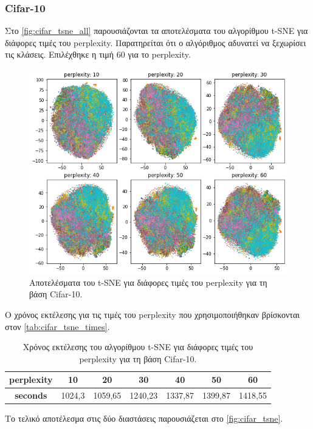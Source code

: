 \documentclass[a4paper]{article}
\begin{document}
\subsubsection{Cifar-10}

Στο \autoref{fig:cifar_tsne_all} παρουσιάζονται τα αποτελέσματα του αλγορίθμου
t-SNE για διάφορες τιμές του perplexity. Παρατηρείται ότι ο αλγόριθμος αδυνατεί
να ξεχωρίσει τις κλάσεις. Επιλέχθηκε η τιμή 60 για το perplexity.

\begin{figure}[H]
    \centering
    \includegraphics[width=0.6\linewidth]{cifar/tsne_all.png}
    \caption{Αποτελέσματα του t-SNE για διάφορες τιμές του perplexity για τη
    βάση Cifar-10.}
    \label{fig:cifar_tsne_all}
\end{figure}

Ο χρόνος εκτέλεσης για τις τιμές του perplexity που χρησιμοποιήθηκαν βρίσκονται
στον \autoref{tab:cifar_tsne_times}.

\begin{table}[H]
\centering
\begin{tabular}{|c|c|c|c|c|c|c|}
\hline
\textbf{perplexity} & \textbf{10} & \textbf{20} & \textbf{30} & \textbf{40} & \textbf{50} & \textbf{60} \\ \hline
\textbf{seconds}    & 1024,3      & 1059,65     & 1240,23     & 1337,87     & 1399,87     & 1418,55     \\ \hline
\end{tabular}
\caption{Χρόνος εκτέλεσης του αλγορίθμου t-SNE για διάφορες τιμές του perplexity
    για τη βάση Cifar-10.}
\label{tab:cifar_tsne_times}
\end{table}

Το τελικό αποτέλεσμα στις δύο διαστάσεις παρουσιάζεται στο
\autoref{fig:cifar_tsne}.
\end{document}
